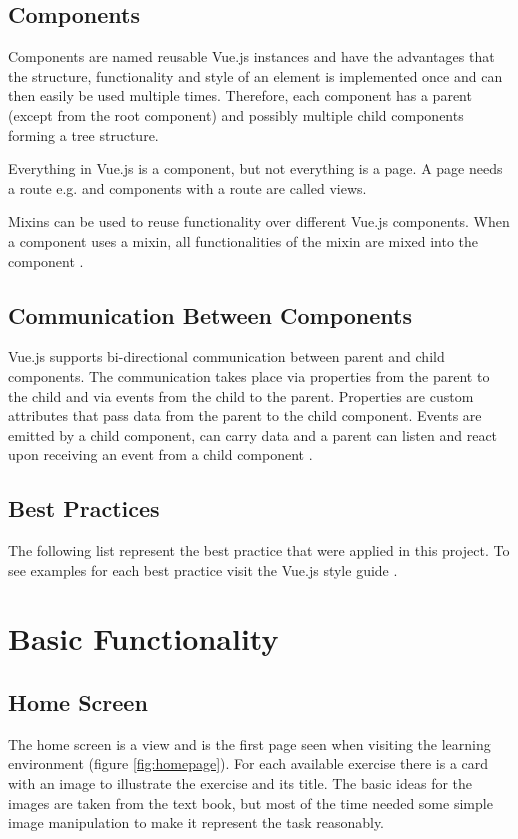 \subsection{Components}
Components are named reusable Vue.js instances and have the advantages that the structure, functionality and style of an element is implemented once and can then easily be used multiple times. Therefore, each component has a parent (except from the root component) and possibly multiple child components forming a tree structure. 

Everything in Vue.js is a component, but not everything is a page. A page needs a route e.g.  and components with a route are called views. 

Mixins can be used to reuse functionality over different Vue.js components. When a component uses a mixin, all functionalities of the mixin are mixed into the component \cite{Vue}. 

\subsection{Communication Between Components}
Vue.js supports bi-directional communication between parent and child components. The communication takes place via properties from the parent to the child and via events from the child to the parent. Properties are custom attributes that pass data from the parent to the child component. Events are emitted by a child component, can carry data and a parent can listen and react upon receiving an event from a child component \cite{Vue}.

\subsection{Best Practices}
The following list represent the best practice that were applied in this project. To see examples for each best practice visit the Vue.js style guide  \cite{VueStyleGuide}.

\section{Basic Functionality}
\label{section:basicFunctionality}

\subsection{Home Screen}
The home screen is a view and is the first page seen when visiting the learning environment (figure \ref{fig:homepage}). For each available exercise there is a card with an image to illustrate the exercise and its title. The basic ideas for the images are taken from the text book, but most of the time needed some simple image manipulation to make it represent the task reasonably.


